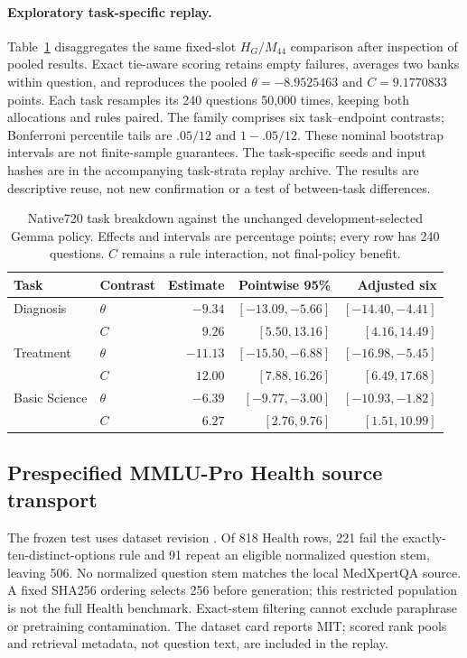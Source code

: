 \paragraph{Exploratory task-specific replay.}
Table~\ref{tab:taskstrata} disaggregates the same fixed-slot $H_G/M_{44}$ comparison after inspection of pooled results. Exact tie-aware scoring retains empty failures, averages two banks within question, and reproduces the pooled $\theta=-8.9525463$ and $C=9.1770833$ points. Each task resamples its 240 questions 50,000 times, keeping both allocations and rules paired. The family comprises six task--endpoint contrasts; Bonferroni percentile tails are $.05/12$ and $1-.05/12$. These nominal bootstrap intervals are not finite-sample guarantees. The task-specific seeds and input hashes are in the accompanying task-strata replay archive. The results are descriptive reuse, not new confirmation or a test of between-task differences.

\begin{table}[h]
\centering\small
\caption{Native720 task breakdown against the unchanged development-selected Gemma policy. Effects and intervals are percentage points; every row has 240 questions. $C$ remains a rule interaction, not final-policy benefit.}
\label{tab:taskstrata}
\begin{tabular}{llrrr}
\toprule
Task & Contrast & Estimate & Pointwise 95\% & Adjusted six\\
\midrule
Diagnosis & $\theta$ & $-9.34$ & $[-13.09,-5.66]$ & $[-14.40,-4.41]$\\
 & $C$ & $9.26$ & $[5.50,13.16]$ & $[4.16,14.49]$\\
Treatment & $\theta$ & $-11.13$ & $[-15.50,-6.88]$ & $[-16.98,-5.45]$\\
 & $C$ & $12.00$ & $[7.88,16.26]$ & $[6.49,17.68]$\\
Basic Science & $\theta$ & $-6.39$ & $[-9.77,-3.00]$ & $[-10.93,-1.82]$\\
 & $C$ & $6.27$ & $[2.76,9.76]$ & $[1.51,10.99]$\\
\bottomrule
\end{tabular}
\end{table}


\subsection{Prespecified MMLU-Pro Health source transport}\label{app:health}

The frozen test uses dataset revision . Of 818 Health rows, 221 fail the exactly-ten-distinct-options rule and 91 repeat an eligible normalized question stem, leaving 506. No normalized question stem matches the local MedXpertQA source. A fixed SHA256 ordering selects 256 before generation; this restricted population is not the full Health benchmark. Exact-stem filtering cannot exclude paraphrase or pretraining contamination. The dataset card reports MIT; scored rank pools and retrieval metadata, not question text, are included in the replay.

